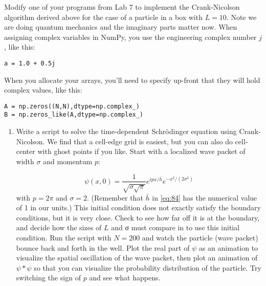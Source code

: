 \begin{problem}\label{P8.2}
Modify one of your programs from Lab 7 to implement the Crank-Nicolson algorithm derived above for the case of a particle in a box with $L = 10$. Note we are doing quantum mechanics and the imaginary parts matter now. When assigning complex variables in NumPy, you use the engineering complex number $j$, like this:
\begin{lstlisting}
a = 1.0 + 0.5j
\end{lstlisting}
When you allocate your arrays, you\rq ll need to specify up-front that they will
hold complex values, like this:
\begin{lstlisting}
A = np.zeros((N,N),dtype=np.complex_)
B = np.zeros_like(A,dtype=np.complex_)
\end{lstlisting}

\begin{enumerate}[label=(\alph*)]
	\item  Write a script to solve the time-dependent Schr{\"o}dinger equation using
Crank-Nicolson. We find that a cell-edge grid is easiest, but you can
also do cell-center with ghost points if you like. Start with a localized
wave packet of width $\sigma$ and momentum $p$:

\begin{equation}\label{eq:84}
\psi(x, 0)=\frac{1}{\sqrt{\sigma \sqrt{\pi}}} e^{i p x / \bar{h}} e^{-x^{2} /\left(2 \sigma^{2}\right)}
\end{equation}
with $p = 2\pi$ and $\sigma = 2$. (Remember that $ \bar{h}$ in \ref{eq:84} has the numerical
value of 1 in our units.) This initial condition does not exactly satisfy
the boundary conditions, but it is very close. Check to see how far
off it is at the boundary, and decide how the sizes of $L$ and σ must
compare in to use this initial condition.
Run the script with $N = 200$ and watch the particle (wave packet)
bounce back and forth in the well. Plot the real part of $\psi$ as an animation to visualize the spatial oscillation of the wave packet, then
plot an animation of $\psi * \psi$  so that you can visualize the probability
distribution of the particle. Try switching the sign of $p$ and see what
happens.


\end{enumerate}
\end{problem}
